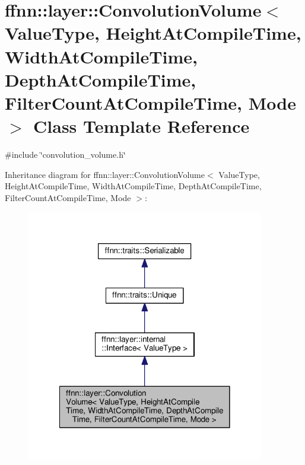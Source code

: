 \hypertarget{classffnn_1_1layer_1_1_convolution_volume}{\section{ffnn\-:\-:layer\-:\-:Convolution\-Volume$<$ Value\-Type, Height\-At\-Compile\-Time, Width\-At\-Compile\-Time, Depth\-At\-Compile\-Time, Filter\-Count\-At\-Compile\-Time, Mode $>$ Class Template Reference}
\label{classffnn_1_1layer_1_1_convolution_volume}
}


{\ttfamily \#include \char`\"{}convolution\-\_\-volume.\-h\char`\"{}}



Inheritance diagram for ffnn\-:\-:layer\-:\-:Convolution\-Volume$<$ Value\-Type, Height\-At\-Compile\-Time, Width\-At\-Compile\-Time, Depth\-At\-Compile\-Time, Filter\-Count\-At\-Compile\-Time, Mode $>$\-:
\nopagebreak
\begin{figure}[H]
\begin{center}
\leavevmode
\includegraphics[width=294pt]{classffnn_1_1layer_1_1_convolution_volume__inherit__graph}
\end{center}
\end{figure}



